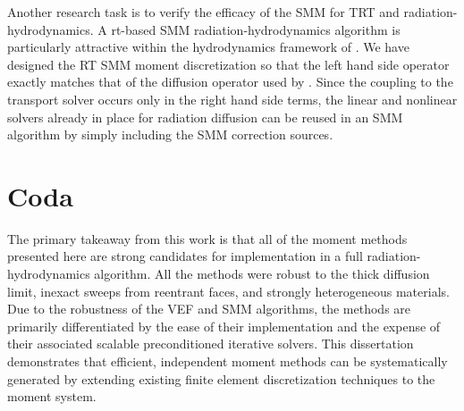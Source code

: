 \documentclass[../doc.tex]{subfiles}
\begin{document}
Another research task is to verify the efficacy of the SMM for TRT and radiation-hydrodynamics. A \gls{rt}-based SMM radiation-hydrodynamics algorithm is particularly attractive within the hydrodynamics framework of \cite{blast}. We have designed the RT SMM moment discretization so that the left hand side operator exactly matches that of the diffusion operator used by \cite{blast}. Since the coupling to the transport solver occurs only in the right hand side terms, the linear and nonlinear solvers already in place for radiation diffusion can be reused in an SMM algorithm by simply including the SMM correction sources. 

\section{Coda}
The primary takeaway from this work is that all of the moment methods presented here are strong candidates for implementation in a full radiation-hydrodynamics algorithm. All the methods were robust to the thick diffusion limit, inexact sweeps from reentrant faces, and strongly heterogeneous materials. Due to the robustness of the VEF and SMM algorithms, the methods are primarily differentiated by the ease of their implementation and the expense of their associated scalable preconditioned iterative solvers. This dissertation demonstrates that efficient, independent moment methods can be systematically generated by extending existing finite element discretization techniques to the moment system. 
\end{document}
